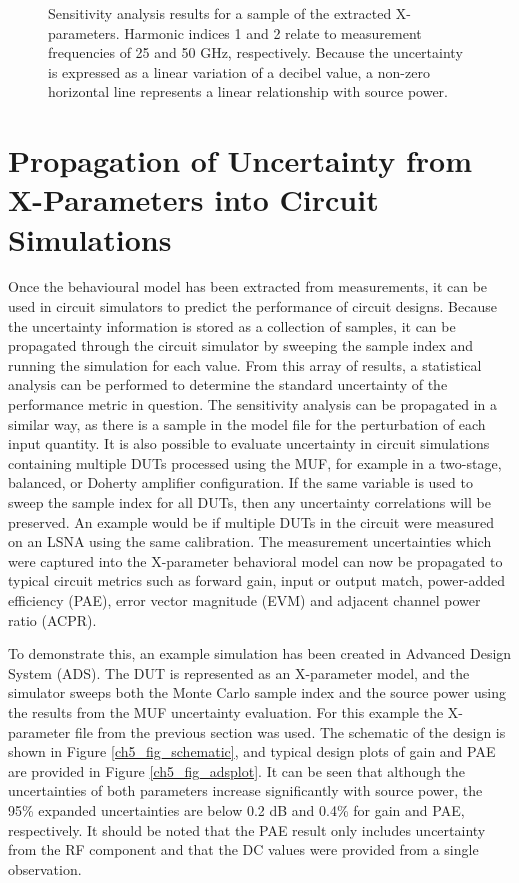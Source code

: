 \documentclass[../thesis/thesis.tex]{subfiles}
\begin{document}
\begin{figure}
\begin{subfigure}{0.45\textwidth}
		\label{ch5_fig_t2121phasesens}
	\end{subfigure}
	\caption[Sensitivity analysis results for a sample of the extracted X-parameters.]{Sensitivity analysis results for a sample of the extracted X-parameters. Harmonic indices 1 and 2 relate to measurement frequencies of 25 and 50 GHz, respectively. Because the uncertainty is expressed as a linear variation of a decibel value, a non-zero horizontal line represents a linear relationship with source power.}
	\label{ch5_fig_sensplots}
\end{figure}

\section{Propagation of Uncertainty from X-Parameters into Circuit Simulations}

Once the behavioural model has been extracted from measurements, it can be used in circuit simulators to predict the performance of circuit designs. Because the uncertainty information is stored as a collection of samples, it can be propagated through the circuit simulator by sweeping the sample index and running the simulation for each value. From this array of results, a statistical analysis can be performed to determine the standard uncertainty of the performance metric in question. The sensitivity analysis can be propagated in a similar way, as there is a sample in the model file for the perturbation of each input quantity. It is also possible to evaluate uncertainty in circuit simulations containing multiple DUTs processed using the MUF, for example in a two-stage, balanced, or Doherty amplifier configuration. If the same variable is used to sweep the sample index for all DUTs, then any uncertainty correlations will be preserved. An example would be if multiple DUTs in the circuit were measured on an LSNA using the same calibration.
The measurement uncertainties which were captured into the X-parameter behavioral model can now be propagated to typical circuit metrics such as forward gain, input or output match, power-added efficiency (PAE), error vector magnitude (EVM) and adjacent channel power ratio (ACPR).

To demonstrate this, an example simulation has been created in Advanced Design System (ADS). The DUT is represented as an X-parameter model, and the simulator sweeps both the Monte Carlo sample index and the source power using the results from the MUF uncertainty evaluation. For this example the X-parameter file from the previous section was used. The schematic of the design is shown in Figure \ref{ch5_fig_schematic}, and typical design plots of gain and PAE are provided in Figure \ref{ch5_fig_adsplot}. It can be seen that although the uncertainties of both parameters increase significantly with source power, the 95\% expanded uncertainties are below 0.2 dB and 0.4\% for gain and PAE, respectively. It should be noted that the PAE result only includes uncertainty from the RF component and that the DC values were provided from a single observation.
\end{document}
